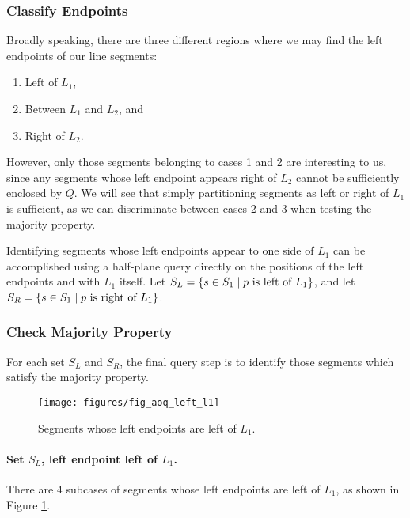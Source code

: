 \subsubsection{Classify Endpoints}
\label{:slabs:one:details:classify}

Broadly speaking, there are three different regions where we may find the left endpoints of our line segments:
\begin{enumerate}
 \item Left of $L_1$,
 \item Between $L_1$ and $L_2$, and
 \item Right of $L_2$.
\end{enumerate}

However, only those segments belonging to cases 1 and 2 are interesting to us, since any segments whose left endpoint appears right of $L_2$ cannot be sufficiently enclosed by $Q$. We will see that simply partitioning segments as left or right of $L_1$ is sufficient, as we can discriminate between cases 2 and 3 when testing the majority property.

Identifying segments whose left endpoints appear to one side of $L_1$ can be accomplished using a half-plane query directly on the positions of the left endpoints and with $L_1$ itself.  Let $S_L = \{ s \in S_1 \;|\; p \text{ is left of } L_1 \}$, and let $S_R = \{ s \in S_1 \;|\; p \text{ is right of } L_1 \}$.


\subsubsection{Check Majority Property}
\label{:slabs:one:details:majority}

For each set $S_L$ and $S_R$, the final query step is to identify those segments which satisfy the majority property.

\begin{figure}[t]
\begin{center}
  \texttt{[image: figures/fig\_aoq\_left\_l1]}
  \caption{Segments whose left endpoints are left of $L_1$.}
  \label{fig:slabs:one:aoq_left_l1}
\end{center}
\end{figure}

\paragraph{Set $S_L$, left endpoint left of $L_1$.} There are 4 subcases of segments whose left endpoints are left of $L_1$, as shown in Figure \ref{fig:slabs:one:aoq_left_l1}.

